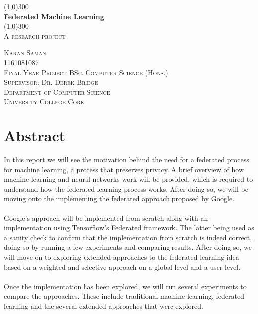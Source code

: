\documentclass[12pt]{article}
\begin{document}
\makeatletter

\begin{titlepage}
	\begin{center}
		\line(1,0){300}\\				
		[0.32cm]
		\huge{\bfseries Federated Machine Learning}\\
		[0.16cm]		
		\line(1,0){300}\\
		[0.64cm]		
		\textsc{\LARGE A research project}\\
		[10cm]
	\end{center}
	\begin{center}
		\textsc{\large Karan Samani}\\
		\textsc{\large 1161081087}\\
		\textsc{\large Final Year Project BSc. Computer Science (Hons.)}\\
		\textsc{\large Supervisor: Dr. Derek Bridge}\\
		\textsc{\large Department of Computer Science}\\
		\textsc{\large University College Cork}\\
		\textsc{\large \@date}
	\end{center}
\end{titlepage}
\cleardoublepage

\section*{Abstract}
In this report we will see the motivation behind the need for a federated process for machine learning, a process that preserves privacy. A brief overview of how machine learning and neural networks work will be provided, which is required to understand how the federated learning process works. After doing so, we will be moving onto the implementing the federated approach proposed by Google.
\\\\
Google's approach will be implemented from scratch along with an implementation using Tensorflow's Federated framework. The latter being used as a sanity check to confirm that the implementation from scratch is indeed correct, doing so by running a few experiments and comparing results. After doing so, we will move on to exploring extended approaches to the federated learning idea based on a weighted and selective approach on a global level and a user level.
\\\\ 
Once the implementation has been explored, we will run several experiments to compare the approaches. These include traditional machine learning, federated learning and the several extended approaches that were explored.
\clearpage
\end{document}
